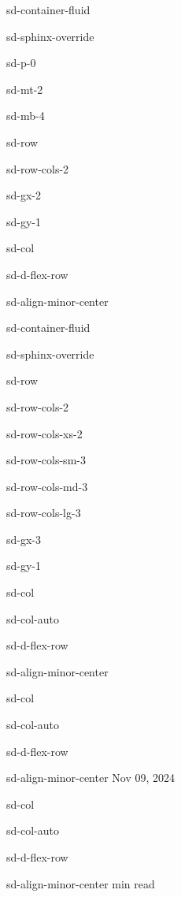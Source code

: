 \documentclass[letterpaper,10pt,english]{jupyterBook}
\begin{document}
\begin{sphinxuseclass}{sd-container-fluid}
\begin{sphinxuseclass}{sd-sphinx-override}
\begin{sphinxuseclass}{sd-p-0}
\begin{sphinxuseclass}{sd-mt-2}
\begin{sphinxuseclass}{sd-mb-4}
\begin{sphinxuseclass}{sd-row}
\begin{sphinxuseclass}{sd-row-cols-2}
\begin{sphinxuseclass}{sd-gx-2}
\begin{sphinxuseclass}{sd-gy-1}
\begin{sphinxuseclass}{sd-col}
\begin{sphinxuseclass}{sd-d-flex-row}
\begin{sphinxuseclass}{sd-align-minor-center}
\begin{sphinxuseclass}{sd-container-fluid}
\begin{sphinxuseclass}{sd-sphinx-override}
\begin{sphinxuseclass}{sd-row}
\begin{sphinxuseclass}{sd-row-cols-2}
\begin{sphinxuseclass}{sd-row-cols-xs-2}
\begin{sphinxuseclass}{sd-row-cols-sm-3}
\begin{sphinxuseclass}{sd-row-cols-md-3}
\begin{sphinxuseclass}{sd-row-cols-lg-3}
\begin{sphinxuseclass}{sd-gx-3}
\begin{sphinxuseclass}{sd-gy-1}
\begin{sphinxuseclass}{sd-col}
\begin{sphinxuseclass}{sd-col-auto}
\begin{sphinxuseclass}{sd-d-flex-row}
\begin{sphinxuseclass}{sd-align-minor-center}
\end{sphinxuseclass}
\end{sphinxuseclass}
\end{sphinxuseclass}
\end{sphinxuseclass}
\begin{sphinxuseclass}{sd-col}
\begin{sphinxuseclass}{sd-col-auto}
\begin{sphinxuseclass}{sd-d-flex-row}
\begin{sphinxuseclass}{sd-align-minor-center}
\sphinxAtStartPar
Nov 09, 2024

\end{sphinxuseclass}
\end{sphinxuseclass}
\end{sphinxuseclass}
\end{sphinxuseclass}
\begin{sphinxuseclass}{sd-col}
\begin{sphinxuseclass}{sd-col-auto}
\begin{sphinxuseclass}{sd-d-flex-row}
\begin{sphinxuseclass}{sd-align-minor-center}
 min read


\end{sphinxuseclass}
\end{sphinxuseclass}
\end{sphinxuseclass}
\end{sphinxuseclass}
\end{sphinxuseclass}
\end{sphinxuseclass}
\end{sphinxuseclass}
\end{sphinxuseclass}
\end{sphinxuseclass}
\end{sphinxuseclass}
\end{sphinxuseclass}
\end{sphinxuseclass}
\end{sphinxuseclass}
\end{sphinxuseclass}
\end{sphinxuseclass}
\end{sphinxuseclass}
\end{sphinxuseclass}
\end{sphinxuseclass}
\end{sphinxuseclass}
\end{sphinxuseclass}
\end{sphinxuseclass}
\end{sphinxuseclass}
\end{sphinxuseclass}
\end{sphinxuseclass}
\end{sphinxuseclass}
\end{sphinxuseclass}
\end{document}
